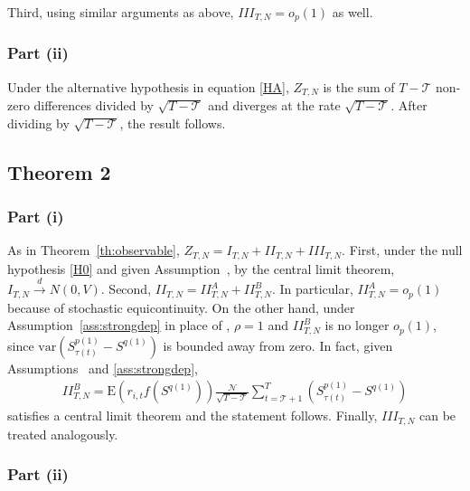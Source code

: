Third, using similar arguments as above, $III_{T,N}=o_{p}(1)$ as well.

\subsubsection{Part (ii)}

Under the alternative hypothesis in equation \eqref{HA}, $Z_{T,N}$ is the sum of $T-\mathcal{T}$ non-zero differences divided by $\sqrt{T-\mathcal{T}}$ and diverges at the rate $\sqrt{T-\mathcal{T}}$. After dividing by $\sqrt{T-\mathcal{T}}$, the result follows.




\subsection{Theorem 2}
\label{Proof of th:strongdep}

\subsubsection{Part (i)}

As in Theorem~\ref{th:observable}, $Z_{T,N}=I_{T,N}+II_{T,N}+III_{T,N}$. First, under the null hypothesis \ref{H0} and given Assumption~, by the central limit theorem, $I_{T,N}\overset{d}{\rightarrow } N\left( 0,V\right)$. Second, $II_{T,N}=II_{T,N}^{A}+II_{T,N}^{B}$. In particular, $II_{T,N}^{A}=o_{p}(1)$ because of stochastic equicontinuity. On the other hand, under Assumption~\ref{ass:strongdep} in place of , $\rho =1$ and $II_{T,N}^{B}$ is no longer $o_{p}(1)$, since $\mathrm{var}\left( S_{\tau(t)}^{p(1)}-S^{q(1)} \right)$ is bounded away from zero. In fact, given Assumptions~ and \ref{ass:strongdep},
\begin{align*}
II_{T,N}^{B}=\mathrm{E}\left( r_{i,t} f\left( S^{q(1)}\right) \right) \frac{\mathcal{N}}{\sqrt{T - \mathcal{T}}} \sum_{t=\mathcal{T}+1}^{T}\left( S_{\tau(t)}^{p(1)}-S^{q(1)} \right) 
\end{align*}
satisfies a central limit theorem and the statement follows. Finally, $III_{T,N}$ can be treated analogously.

\subsubsection{Part (ii)}

